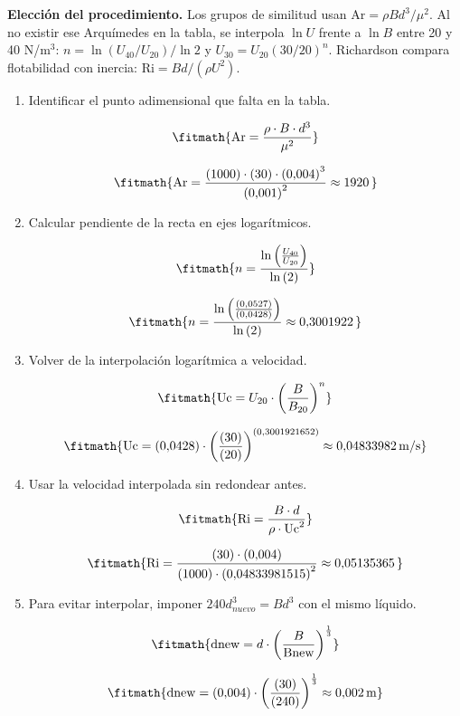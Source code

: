 \noindent\textbf{Elección del procedimiento.} Los grupos de similitud usan $\mathrm{Ar}=\rho Bd^3/\mu^2$. Al no existir ese Arquímedes en la tabla, se interpola $\ln U$ frente a $\ln B$ entre 20 y 40 N/m$^3$: $n=\ln(U_{40}/U_{20})/\ln2$ y $U_{30}=U_{20}(30/20)^n$. Richardson compara flotabilidad con inercia: $\mathrm{Ri}=Bd/(\rho U^2)$.

\begin{enumerate}

\item Identificar el punto adimensional que falta en la tabla.

\[\fitmath{\mathrm{Ar}=\frac{\rho\cdot B\cdot {d}^{3}}{{\mu}^{2}}}\]

\[\fitmath{\mathrm{Ar}=\frac{(1000)\cdot (30)\cdot {(0{,}004)}^{3}}{{(0{,}001)}^{2}}\approx 1920\,}\]

\item Calcular pendiente de la recta en ejes logarítmicos.

\[\fitmath{n=\frac{\ln\left(\frac{U_{40}}{U_{20}}\right)}{\ln\left(2\right)}}\]

\[\fitmath{n=\frac{\ln\left(\frac{(0{,}0527)}{(0{,}0428)}\right)}{\ln\left(2\right)}\approx 0{,}3001922\,}\]

\item Volver de la interpolación logarítmica a velocidad.

\[\fitmath{\mathrm{Uc}=U_{20}\cdot {\left(\frac{B}{B_{20}}\right)}^{n}}\]

\[\fitmath{\mathrm{Uc}=(0{,}0428)\cdot {\left(\frac{(30)}{(20)}\right)}^{(0{,}3001921652)}\approx 0{,}04833982\,\mathrm{m/s}}\]

\item Usar la velocidad interpolada sin redondear antes.

\[\fitmath{\mathrm{Ri}=\frac{B\cdot d}{\rho\cdot {\mathrm{Uc}}^{2}}}\]

\[\fitmath{\mathrm{Ri}=\frac{(30)\cdot (0{,}004)}{(1000)\cdot {(0{,}04833981515)}^{2}}\approx 0{,}05135365\,}\]

\item Para evitar interpolar, imponer $240d_{nuevo}^3=Bd^3$ con el mismo líquido.

\[\fitmath{\mathrm{dnew}=d\cdot {\left(\frac{B}{\mathrm{Bnew}}\right)}^{\frac{1}{3}}}\]

\[\fitmath{\mathrm{dnew}=(0{,}004)\cdot {\left(\frac{(30)}{(240)}\right)}^{\frac{1}{3}}\approx 0{,}002\,\mathrm{m}}\]

\end{enumerate}
